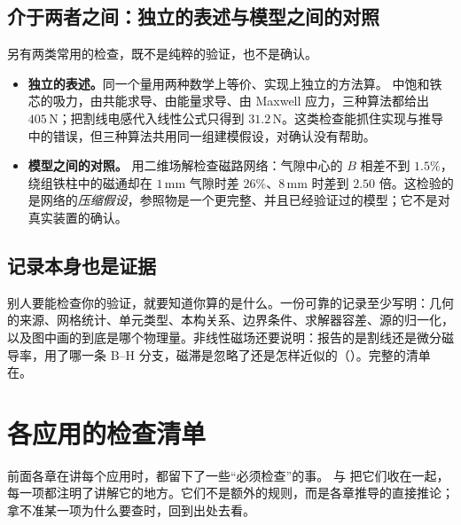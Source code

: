 \subsection{介于两者之间：独立的表述与模型之间的对照}
另有两类常用的检查，既不是纯粹的验证，也不是确认。
\begin{itemize}
\item \textbf{独立的表述。}同一个量用两种数学上等价、实现上独立的方法算。 中饱和铁芯的吸力，由共能求导、由能量求导、由 Maxwell 应力，三种算法都给出 $405\,\mathrm N$；把割线电感代入线性公式只得到 $31.2\,\mathrm N$。这类检查能抓住实现与推导中的错误，但三种算法共用同一组建模假设，对确认没有帮助。
\item \textbf{模型之间的对照。} 用二维场解检查磁路网络：气隙中心的 $B$ 相差不到 $1.5\%$，绕组铁柱中的磁通却在 $1\,\mathrm{mm}$ 气隙时差 $26\%$、$8\,\mathrm{mm}$ 时差到 $2.50$ 倍。这检验的是网络的\emph{压缩假设}，参照物是一个更完整、并且已经验证过的模型；它不是对真实装置的确认。
\end{itemize}

\subsection{记录本身也是证据}
别人要能检查你的验证，就要知道你算的是什么。一份可靠的记录至少写明：几何的来源、网格统计、单元类型、本构关系、边界条件、求解器容差、源的归一化，以及图中画的到底是哪个物理量。非线性磁场还要说明：报告的是割线还是微分磁导率，用了哪一条 B--H 分支，磁滞是忽略了还是怎样近似的（）。完整的清单在。

\section{各应用的检查清单}\label{sec:practice-checklists}

前面各章在讲每个应用时，都留下了一些“必须检查”的事。 与 把它们收在一起，每一项都注明了讲解它的地方。它们不是额外的规则，而是各章推导的直接推论；拿不准某一项为什么要查时，回到出处去看。

